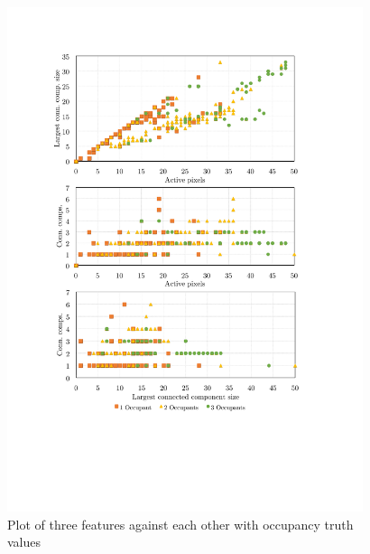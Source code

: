 \documentclass[../thesis/thesis.tex]{subfiles}
\begin{document}
\begin{figure}
\centering
\includegraphics[width=0.93\textwidth]{../diagrams/feature-plots.pdf}
\caption{Plot of three features against each other with occupancy truth values}
\label{fig:featplots}
\end{figure}
\end{document}
